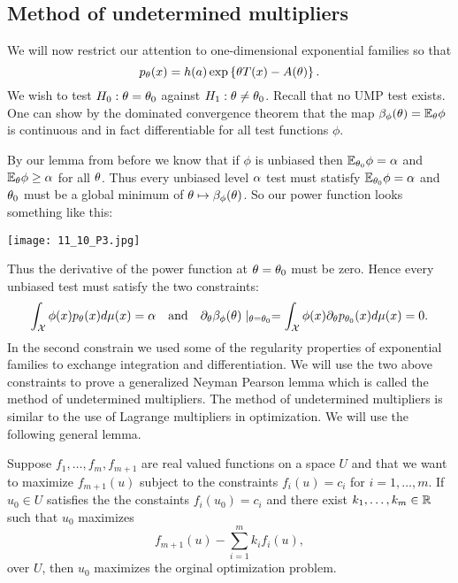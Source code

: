 \subsection{Method of undetermined multipliers}
We will now restrict our attention to one-dimensional exponential families so that 
\[p_{\theta}(x) = h(a)\exp\left\{{\theta} T(x)-A({\theta})\right\}.\]
We wish to test $H_0 : {\theta}={\theta}_0$ against $H_1 :{\theta} \neq {\theta}_0$. Recall that no UMP test exists. One can show by the dominated convergence theorem that the map $\beta_\phi({\theta}) = {\mathbb{E}}_{\theta} \phi$ is continuous and in fact differentiable for all test functions $\phi$. 

By our lemma from before we know that if $\phi$ is unbiased then ${\mathbb{E}}_{{\theta}_0}\phi = {\alpha}$ and ${\mathbb{E}}_{\theta} \phi \ge {\alpha}$ for all ${\theta}$. Thus every unbiased level ${\alpha}$ test must statisfy ${\mathbb{E}}_{{\theta}_0}\phi={\alpha}$ and ${\theta}_0$ must be a global minimum of ${\theta} \mapsto \beta_\phi({\theta})$. So our power function looks something like this:

\begin{center}
    \texttt{[image: 11\_10\_P3.jpg]}
\end{center}


Thus the derivative of the power function at ${\theta}={\theta}_0$ must be zero. Hence every unbiased test must satisfy the two constraints:
\begin{equation}\label{constrain}
    \int_{\mathcal{X}} \phi(x) p_{\theta}(x)d\mu(x) = {\alpha} ~~~\text{and}~~~ \partial_{\theta} \beta_\phi({\theta})\mid_{{\theta} = {\theta}_0} = \int_{\mathcal{X}} \phi(x) \partial_{\theta} p_{{\theta}_0}(x)d\mu(x) =0.
\end{equation}
In the second constrain we used some of the regularity properties of exponential families to exchange integration and differentiation. We will use the two above constraints to prove a generalized Neyman Pearson lemma which is called the method of undetermined multipliers. The method of undetermined multipliers is similar to the use of Lagrange multipliers in optimization. We will use the following general lemma.
\begin{lemma}
    Suppose $f_1,\ldots,f_m,f_{m+1}$ are real valued functions on a space $U$ and that we want to maximize $f_{m+1}(u)$ subject to the constraints $f_i(u)=c_i$ for $i=1,\ldots,m$. If $u_0 \in U$ satisfies the the constaints $f_i(u_0)=c_i$ and there exist $k_1,\ldots,k_m \in {\mathbb R}$ such that $u_0$ maximizes
    \[f_{m+1}(u)-\sum_{i=1}^m k_if_i(u),\]
    over $U$, then $u_0$ maximizes the orginal optimization problem.
\end{lemma}
 
